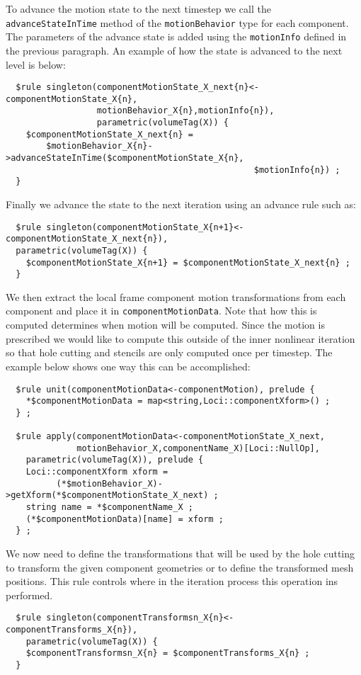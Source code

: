 \documentclass{article}
\begin{document}
To advance the motion state to the next timestep we call the
{\tt advanceStateInTime} method of the {\tt motionBehavior} type for each
component.  The parameters of the advance state is added using the
{\tt motionInfo} defined in the previous paragraph.  An example of how the
state is advanced to the next level is below:
\begin{verbatim}
  $rule singleton(componentMotionState_X_next{n}<-componentMotionState_X{n},
                  motionBehavior_X{n},motionInfo{n}),
                  parametric(volumeTag(X)) {
    $componentMotionState_X_next{n} = 
        $motionBehavior_X{n}->advanceStateInTime($componentMotionState_X{n},
                                                 $motionInfo{n}) ;
  }
\end{verbatim}

Finally we advance the state to the next iteration using an advance
rule such as:
\begin{verbatim}
  $rule singleton(componentMotionState_X{n+1}<-componentMotionState_X_next{n}),
  parametric(volumeTag(X)) {
    $componentMotionState_X{n+1} = $componentMotionState_X_next{n} ;
  }
\end{verbatim}

We then extract the local frame component motion transformations from
each component and place it in {\tt componentMotionData}. Note that
how this is computed determines when motion will be computed. Since
the motion is prescribed we would like to compute this outside of the
inner nonlinear iteration so that hole cutting and stencils are only
computed once per timestep.  The example below shows one way this can
be accomplished:
\begin{verbatim}
  $rule unit(componentMotionData<-componentMotion), prelude {
    *$componentMotionData = map<string,Loci::componentXform>() ;
  } ;

  $rule apply(componentMotionData<-componentMotionState_X_next,
              motionBehavior_X,componentName_X)[Loci::NullOp],
    parametric(volumeTag(X)), prelude {
    Loci::componentXform xform = 
          (*$motionBehavior_X)->getXform(*$componentMotionState_X_next) ;
    string name = *$componentName_X ;
    (*$componentMotionData)[name] = xform ;
  } ;
\end{verbatim}

We now need to define the transformations that will be used by the
hole cutting to transform the given component geometries or to define
the transformed mesh positions.  This rule controls where in the
iteration process this operation ins performed.
\begin{verbatim}
  $rule singleton(componentTransformsn_X{n}<-componentTransforms_X{n}),
    parametric(volumeTag(X)) {
    $componentTransformsn_X{n} = $componentTransforms_X{n} ;
  }
\end{verbatim}
\end{document}
